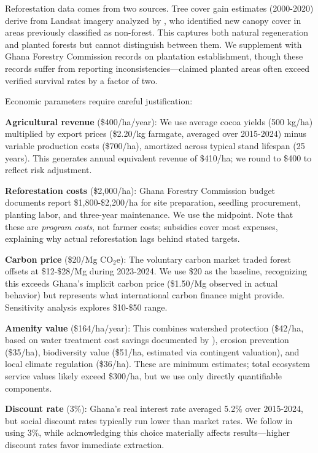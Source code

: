 Reforestation data comes from two sources. Tree cover gain estimates (2000-2020) derive from Landsat imagery analyzed by \citet{song2018massive}, who identified new canopy cover in areas previously classified as non-forest. This captures both natural regeneration and planted forests but cannot distinguish between them. We supplement with Ghana Forestry Commission records on plantation establishment, though these records suffer from reporting inconsistencies—claimed planted areas often exceed verified survival rates by a factor of two.

Economic parameters require careful justification:

\textbf{Agricultural revenue} (\$400/ha/year): We use average cocoa yields (500 kg/ha) multiplied by export prices (\$2.20/kg farmgate, averaged over 2015-2024) minus variable production costs (\$700/ha), amortized across typical stand lifespan (25 years). This generates annual equivalent revenue of \$410/ha; we round to \$400 to reflect risk adjustment.

\textbf{Reforestation costs} (\$2,000/ha): Ghana Forestry Commission budget documents report \$1,800-\$2,200/ha for site preparation, seedling procurement, planting labor, and three-year maintenance. We use the midpoint. Note that these are \textit{program costs}, not farmer costs; subsidies cover most expenses, explaining why actual reforestation lags behind stated targets.

\textbf{Carbon price} (\$20/Mg CO$_2$e): The voluntary carbon market traded forest offsets at \$12-\$28/Mg during 2023-2024. We use \$20 as the baseline, recognizing this exceeds Ghana's implicit carbon price (\$1.50/Mg observed in actual behavior) but represents what international carbon finance might provide. Sensitivity analysis explores \$10-\$50 range.

\textbf{Amenity value} (\$164/ha/year): This combines watershed protection (\$42/ha, based on water treatment cost savings documented by \citet{amoah2021assessing}), erosion prevention (\$35/ha), biodiversity value (\$51/ha, estimated via contingent valuation), and local climate regulation (\$36/ha). These are minimum estimates; total ecosystem service values likely exceed \$300/ha, but we use only directly quantifiable components.

\textbf{Discount rate} (3\%): Ghana's real interest rate averaged 5.2\% over 2015-2024, but social discount rates typically run lower than market rates. We follow \citet{stern2007economics} in using 3\%, while acknowledging this choice materially affects results—higher discount rates favor immediate extraction.

